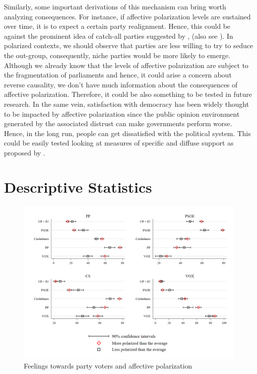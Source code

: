\documentclass[a4paper, svgnames]{article}
\begin{document}
Similarly, some important derivations of this mechanism can bring worth analyzing consequences. For instance, if affective polarization levels are sustained over time, it is to expect a certain party realignment. Hence, this could be against the prominent idea of catch-all parties suggested by \cite{Kirchheimer1966}, (also see \cite{Krouwel2003}). In polarized contexts, we should observe that parties are less willing to try to seduce the out-group, consequently, niche parties would be more likely to emerge. Although we already know that the levels of affective polarization are subject to the fragmentation of parliaments \citep{Orriols2020} and hence, it could arise a concern about reverse causality, we don't have much information about the consequences of affective polarization. Therefore, it could be also something to be tested in future research. In the same vein, satisfaction with democracy has been widely thought to be impacted by affective polarization since the public opinion environment generated by the associated distrust can make governments perform worse. Hence, in the long run, people can get dissatisfied with the political system. This could be easily tested looking at measures of specific and diffuse support as proposed by \cite{Easton1975}.

\section{Descriptive Statistics}
\begin{figure}[H]
\centering

\includegraphics[scale=0.35]{Figures/combinedfeelingsAP.png}
\caption{Feelings towards party voters and affective polarization}
\end{figure}
\end{document}

